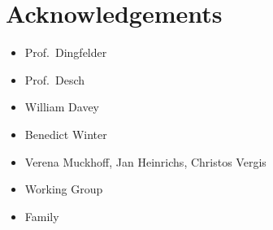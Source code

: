 \chapter{Acknowledgements}
\label{sec:ack}

\begin{itemize}
\item Prof.\ Dingfelder
\item Prof.\ Desch
\item William Davey
\item Benedict Winter
\item Verena Muckhoff, Jan Heinrichs, Christos Vergis
\item Working Group
\item Family
\end{itemize}



